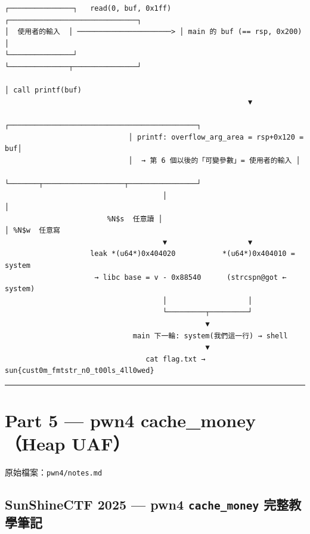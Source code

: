 \documentclass[10pt,a4paper]{article}
\renewenvironment{quote}{%
  \begin{mdframed}[linewidth=0pt,innerleftmargin=0pt,innerrightmargin=0pt,
    innerbottommargin=0pt,innertopmargin=0pt,skipabove=0.55em,skipbelow=0.55em,
    leftmargin=0.9em,rightmargin=0.4em,startcode={\color{quotebar}\vrule width 2.6pt},%
    endcode={}]%
  \itshape\color{black}%
}{%
  \end{mdframed}%
}
\begin{document}
\begin{Verbatim}[breaklines=true,breakanywhere=true,breakautoindent=false,fontsize=\fontsize{7.0}{9.5}\selectfont]
┌───────────────┐   read(0, buf, 0x1ff)   ┌──────────────────────────────┐
│  使用者的輸入  │ ──────────────────────> │ main 的 buf (== rsp, 0x200) │
└───────────────┘                         └──────────────┬───────────────┘
                                                                         │ call printf(buf)
                                                         ▼
                             ┌────────────────────────────────────────────┐
                             │ printf: overflow_arg_area = rsp+0x120 = buf│
                             │  → 第 6 個以後的「可變參數」= 使用者的輸入 │
                             └───────┬───────────────────┬────────────────┘
                                     │                                    │
                        %N$s  任意讀 │                                    │ %N$w  任意寫
                                     ▼                   ▼
                    leak *(u64*)0x404020           *(u64*)0x404010 = system
                     → libc base = v - 0x88540      (strcspn@got ← system)
                                     │                   │
                                     └─────────┬─────────┘
                                               ▼
                              main 下一輪: system(我們這一行) → shell
                                               ▼
                                 cat flag.txt → sun{cust0m_fmtstr_n0_t00ls_4ll0wed}
\end{Verbatim}

\begin{center}\rule{0.5\linewidth}{0.5pt}\end{center}

\section{Part 5 --- pwn4 cache\_money（Heap
UAF）}\label{part-5-pwn4-cache_moneyheap-uaf}

\begin{quote}
原始檔案：\texttt{pwn4/\allowbreak{}notes.\allowbreak{}md}
\end{quote}

\subsection{\texorpdfstring{SunShineCTF 2025 --- pwn4
\texttt{cache\_\allowbreak{}money}
完整教學筆記}{SunShineCTF 2025 --- pwn4 cache\_money 完整教學筆記}}\label{sunshinectf-2025-pwn4-cache_money-ux5b8cux6574ux6559ux5b78ux7b46ux8a18}
\end{document}
